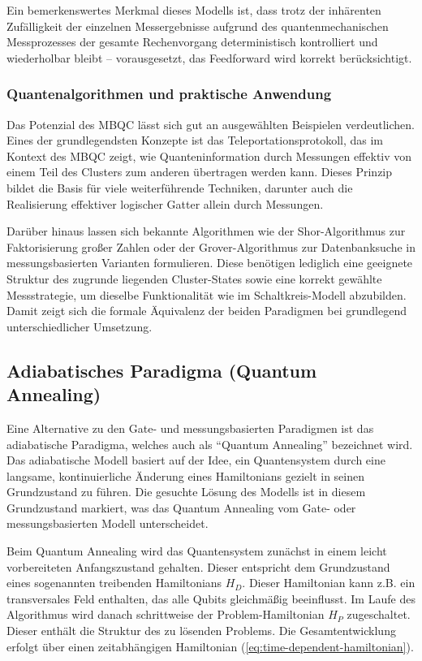 Ein bemerkenswertes Merkmal dieses Modells ist, dass trotz der inhärenten Zufälligkeit der einzelnen Messergebnisse aufgrund des quantenmechanischen Messprozesses der gesamte Rechenvorgang deterministisch kontrolliert und wiederholbar bleibt – vorausgesetzt, das Feedforward wird korrekt berücksichtigt. \autocite[3-4]{briegelMeasurementbasedQuantumComputation2009}

\subsubsection*{Quantenalgorithmen und praktische Anwendung}

Das Potenzial des MBQC lässt sich gut an ausgewählten Beispielen verdeutlichen. Eines der grundlegendsten Konzepte ist das Teleportationsprotokoll, das im Kontext des MBQC zeigt, wie Quanteninformation durch Messungen effektiv von einem Teil des Clusters zum anderen übertragen werden kann. Dieses Prinzip bildet die Basis für viele weiterführende Techniken, darunter auch die Realisierung effektiver logischer Gatter allein durch Messungen.

Darüber hinaus lassen sich bekannte Algorithmen wie der Shor-Algorithmus zur Faktorisierung großer Zahlen oder der Grover-Algorithmus zur Datenbanksuche in messungsbasierten Varianten formulieren. Diese benötigen lediglich eine geeignete Struktur des zugrunde liegenden Cluster-States sowie eine korrekt gewählte Messstrategie, um dieselbe Funktionalität wie im Schaltkreis-Modell abzubilden. Damit zeigt sich die formale Äquivalenz der beiden Paradigmen bei grundlegend unterschiedlicher Umsetzung. \autocite[2]{briegelMeasurementbasedQuantumComputation2009}

\subsection{Adiabatisches Paradigma (Quantum Annealing)}

Eine Alternative zu den Gate- und messungsbasierten Paradigmen ist das adiabatische Paradigma, welches auch als \enquote{Quantum Annealing} bezeichnet wird. Das adiabatische Modell basiert auf der Idee, ein Quantensystem durch eine langsame, kontinuierliche Änderung eines Hamiltonians gezielt in seinen Grundzustand zu führen. Die gesuchte Lösung des Modells ist in diesem Grundzustand markiert, was das Quantum Annealing vom Gate- oder messungsbasierten Modell unterscheidet.

Beim Quantum Annealing wird das Quantensystem zunächst in einem leicht vorbereiteten Anfangszustand gehalten. Dieser entspricht dem Grundzustand eines sogenannten treibenden Hamiltonians $H_D$. Dieser Hamiltonian kann z.B. ein transversales Feld enthalten, das alle Qubits gleichmäßig beeinflusst. Im Laufe des Algorithmus wird danach schrittweise der Problem-Hamiltonian $H_P$ zugeschaltet. Dieser enthält die Struktur des zu lösenden Problems. Die Gesamtentwicklung erfolgt über einen zeitabhängigen Hamiltonian (\autoref{eq:time-dependent-hamiltonian}). 

